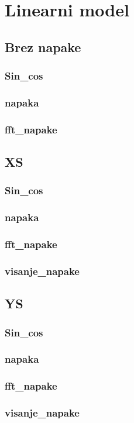 \chapter{Linearni model}
\section{Brez napake}
\subsection{Sin\_cos}
\subsection{napaka}
\subsection{fft\_napake}
\section{XS}
\subsection{Sin\_cos}
\subsection{napaka}
\subsection{fft\_napake}
\subsection{visanje\_napake}

\section{YS}
\subsection{Sin\_cos}
\subsection{napaka}
\subsection{fft\_napake}
\subsection{visanje\_napake}

